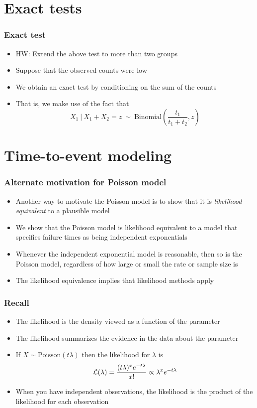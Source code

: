 \documentclass[aspectratio=169]{beamer}
\begin{document}
\section{Exact tests}
\begin{frame}\frametitle{Exact test}
  \begin{itemize}
  \item HW: Extend the above test to more than two groups
  \item Suppose that the observed counts were low
  \item We obtain an exact test by conditioning on the sum of the counts
  \item That is, we make use of the fact that
    $$
    X_1 ~|~ X_1 + X_2 = z ~\sim~\mbox{Binomial}\left(\frac{t_1}{t_1+t_2},z\right)
    $$
  \end{itemize}  
\end{frame}

\section{Time-to-event modeling}
\begin{frame}\frametitle{Alternate motivation for Poisson model}
\begin{itemize}
\item Another way to motivate the Poisson model is to show that
  it is {\em likelihood equivalent} to a plausible model
\item We show that the Poisson model is likelihood equivalent to
  a model that specifies failure times as being independent exponentials
\item Whenever the independent exponential model is reasonable, then so
  is the Poisson model, regardless of how large or small the rate or
  sample size is
\item The likelihood equivalence implies that likelihood methods apply
\end{itemize}
\end{frame}

\begin{frame}\frametitle{Recall}
\begin{itemize}
\item The likelihood is the density viewed as a function of the parameter
\item The likelihood summarizes the evidence in the data about the parameter
\item If $X \sim \mbox{Poisson}(t\lambda)$ then 
  the likelihood for $\lambda$ is 
  $$
  {\cal L}(\lambda) = \frac{(t\lambda)^x e^{-t\lambda}}{x!} \propto \lambda^x e^{-t\lambda}
  $$
\item When you have independent observations, the likelihood is the product
  of the likelihood for each observation
\end{itemize}

\end{frame}
\end{document}
